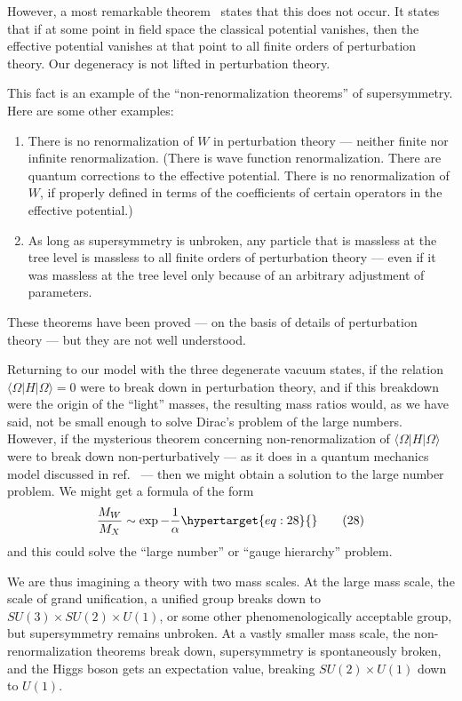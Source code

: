 \documentclass[11pt,a4paper]{article}
\newcommand{\eqtarget}[1]{\hypertarget{eq:#1}{\mathstrut}\tag{#1}}
\begin{document}
However, a most remarkable theorem~\cite{ref10} states that this does not
occur. It states that if at some point in field space the classical
potential vanishes, then the effective potential vanishes at that
point to all finite orders of perturbation theory. Our degeneracy
is not lifted in perturbation theory.

This fact is an example of the ``non-renormalization theorems''
of supersymmetry. Here are some other examples:
\begin{enumerate}
\item[(1)]
There is no renormalization of $W$ in perturbation theory ---
neither finite nor infinite renormalization. (There is wave function
renormalization. There are quantum corrections to the effective
potential. There is no renormalization of $W$, if properly defined in
terms of the coefficients of certain operators in the effective
potential.)
\item[(2)]
As long as supersymmetry is unbroken, any particle that is
massless at the tree level is massless to all finite orders of perturbation
theory --- even if it was massless at the tree level only
because of an arbitrary adjustment of parameters.
\end{enumerate}

These theorems have been proved --- on the basis of details of
perturbation theory --- but they are not well understood.

Returning to our model with the three degenerate vacuum states,
if the relation $\langle \Omega| H |\Omega \rangle = 0$ were to break down in perturbation
theory, and if this breakdown were the origin of the ``light'' masses,
the resulting mass ratios would, as we have said, not be small enough
to solve Dirac's problem of the large numbers. However, if the mysterious
theorem concerning non-renormalization of $\langle \Omega| H |\Omega \rangle$ were to
break down non-perturbatively --- as it does in a quantum mechanics
model discussed in ref.~\cite{ref6} --- then we might obtain a solution to
the large number problem. We might get a formula of the form
\begin{equation}
\frac{M_W}{M_X} \sim \exp - \frac{1}{\alpha}
\eqtarget{28}
\end{equation}
and this could solve the ``large number'' or ``gauge hierarchy'' problem.

We are thus imagining a theory with two mass scales. At the
large mass scale, the scale of grand unification, a unified group
breaks down to $SU(3) \times SU(2) \times U(1)$, or some other phenomenologically
acceptable group, but supersymmetry remains unbroken. At a vastly
smaller mass scale, the non-renormalization theorems break down,
supersymmetry is spontaneously broken, and the Higgs boson gets an
expectation value, breaking $SU(2) \times U(1)$ down to $U(1)$.
\end{document}
